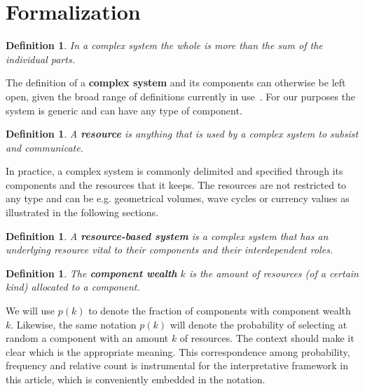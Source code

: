 \documentclass[10pt,letterpaper]{article}
\newtheorem{definition2}[theorem3]{Definition}
\begin{document}
\section{Formalization}\label{sec:form}

\begin{definition2}
In a complex system the whole is more than the sum of the individual parts.
\end{definition2}

The definition of a {\bf complex system} and its components 
can otherwise be left open, given the broad range of definitions currently in use~\cite{complexity}.
For our purposes the system is generic and can have any type of component.


\begin{definition2}
	A {\bf resource} is anything that is used by a complex system to subsist and communicate.
\end{definition2}

In practice, a complex system is commonly delimited and specified through its components and the resources that it keeps. The resources are not restricted to any type and can be e.g. geometrical volumes, wave cycles or currency values as illustrated in the following sections.

\begin{definition2}
	A {\bf resource-based system} is a complex system that has an underlying resource vital to their components and their interdependent roles.
\end{definition2}


\begin{definition2}
	The {\bf component wealth} $k$ is the amount of resources (of a certain kind) allocated to a component.
\end{definition2}

We will use $p(k)$ to denote the fraction of components with component wealth $k$. Likewise, the same notation $p(k)$ will denote the probability of selecting at random a component with an amount $k$ of resources.
The context should make it clear which is the appropriate meaning.
This correspondence among probability, frequency and relative count is
instrumental for the interpretative framework in this article,
which is conveniently embedded in the notation.
\end{document}
